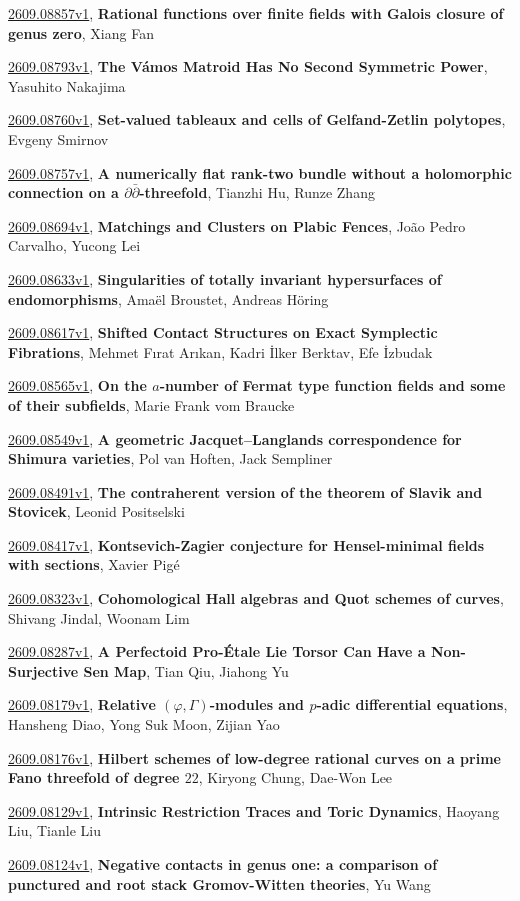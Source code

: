 \documentclass[9pt, a4paper]{article}
\theoremstyle{plain}
\theoremstyle{definition}
\theoremstyle{remark}
\newcommand{\arxiv}[3]{\href{https://arxiv.org/abs/#1}{#1}, \textbf{\textcolor{arxivblue}{#2}}, #3}
\begin{document}
\arxiv{2609.08857v1}{Rational functions over finite fields with Galois closure of genus zero}{Xiang Fan}

\arxiv{2609.08793v1}{The Vámos Matroid Has No Second Symmetric Power}{Yasuhito Nakajima}

\arxiv{2609.08760v1}{Set-valued tableaux and cells of Gelfand-Zetlin polytopes}{Evgeny Smirnov}

\arxiv{2609.08757v1}{A numerically flat rank-two bundle without a holomorphic connection on a $\partial\bar\partial$-threefold}{Tianzhi Hu, Runze Zhang}

\arxiv{2609.08694v1}{Matchings and Clusters on Plabic Fences}{João Pedro Carvalho, Yucong Lei}

\arxiv{2609.08633v1}{Singularities of totally invariant hypersurfaces of endomorphisms}{Amaël Broustet, Andreas Höring}

\arxiv{2609.08617v1}{Shifted Contact Structures on Exact Symplectic Fibrations}{Mehmet Fırat Arıkan, Kadri İlker Berktav, Efe İzbudak}

\arxiv{2609.08565v1}{On the $a$-number of Fermat type function fields and some of their subfields}{Marie Frank vom Braucke}

\arxiv{2609.08549v1}{A geometric Jacquet--Langlands correspondence for Shimura varieties}{Pol van Hoften, Jack Sempliner}

\arxiv{2609.08491v1}{The contraherent version of the theorem of Slavik and Stovicek}{Leonid Positselski}

\arxiv{2609.08417v1}{Kontsevich-Zagier conjecture for Hensel-minimal fields with sections}{Xavier Pigé}

\arxiv{2609.08323v1}{Cohomological Hall algebras and Quot schemes of curves}{Shivang Jindal, Woonam Lim}

\arxiv{2609.08287v1}{A Perfectoid Pro-Étale Lie Torsor Can Have a Non-Surjective Sen Map}{Tian Qiu, Jiahong Yu}

\arxiv{2609.08179v1}{Relative $(\varphi, Γ)$-modules and $p$-adic differential equations}{Hansheng Diao, Yong Suk Moon, Zijian Yao}

\arxiv{2609.08176v1}{Hilbert schemes of low-degree rational curves on a prime Fano threefold of degree $22$}{Kiryong Chung, Dae-Won Lee}

\arxiv{2609.08129v1}{Intrinsic Restriction Traces and Toric Dynamics}{Haoyang Liu, Tianle Liu}

\arxiv{2609.08124v1}{Negative contacts in genus one: a comparison of punctured and root stack Gromov-Witten theories}{Yu Wang}
\end{document}
